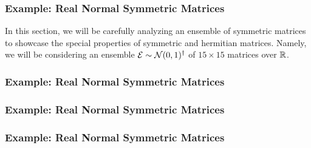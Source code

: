 \begin{frame} \frametitle{Example: Real Normal Symmetric Matrices}

  In this section, we will be carefully analyzing an ensemble of symmetric matrices to showcase
  the special properties of symmetric and hermitian matrices.
  Namely, we will be considering an ensemble $\mathcal{E} \sim \mathcal{N}(0,1)^\dagger$ of $15 \times 15$ matrices over $\mathbb{R}$.

\end{frame}

\begin{frame} \frametitle{Example: Real Normal Symmetric Matrices}


\end{frame}

\begin{frame} \frametitle{Example: Real Normal Symmetric Matrices}


\end{frame}

\begin{frame} \frametitle{Example: Real Normal Symmetric Matrices}


\end{frame}


